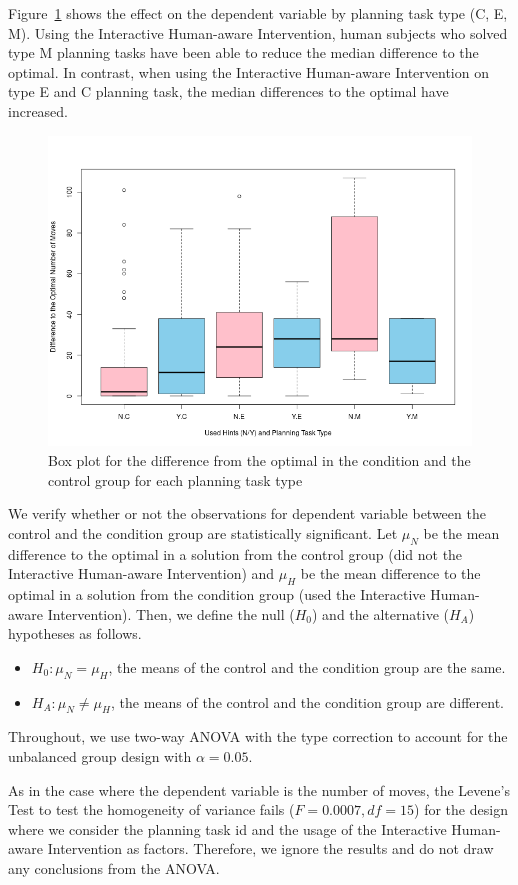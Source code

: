 Figure~\ref{fig:lenoptbytype} shows the effect on the  dependent variable by planning task type (C, E, M).
Using the Interactive Human-aware Intervention, human subjects who solved type M planning tasks have been able to reduce the median difference to the optimal.
In contrast, when using the Interactive Human-aware Intervention on type E and C planning task, the median differences to the optimal have increased.

\begin{figure}[tpb]
  \centering
\includegraphics[width=0.7\columnwidth]{img/lenoptbytype.png}
  \caption{Box plot for the difference from the optimal in the condition and the control group for each planning task type}
  \label{fig:lenoptbytype}
\end{figure}

We verify whether or not the observations for dependent variable between the control and the condition group are statistically significant.
Let $\mu_N$ be the mean difference to the optimal in a solution from the control group (did not the Interactive Human-aware Intervention) and $\mu_H$ be the mean difference to the optimal in a solution from the condition group (used the Interactive Human-aware Intervention).
Then, we define the null ($H_0$) and the alternative ($H_A$) hypotheses as follows.
\begin{itemize}
\item $H_0: \mu_N = \mu_H$, the means of the control and the condition group are the same.
\item $H_A: \mu_N \neq \mu_H$, the means of the control and the condition group are different.
\end{itemize}
Throughout, we use two-way ANOVA with the type  correction to account for the unbalanced group design with $\alpha=0.05$.

As in the case where the dependent variable is the number of moves, the Levene's Test to test the homogeneity of variance fails ($F=0.0007, df=15$) for the design where we consider the planning task id and the usage of the Interactive Human-aware Intervention as factors.
Therefore, we ignore the results and do not draw any conclusions from the ANOVA.


